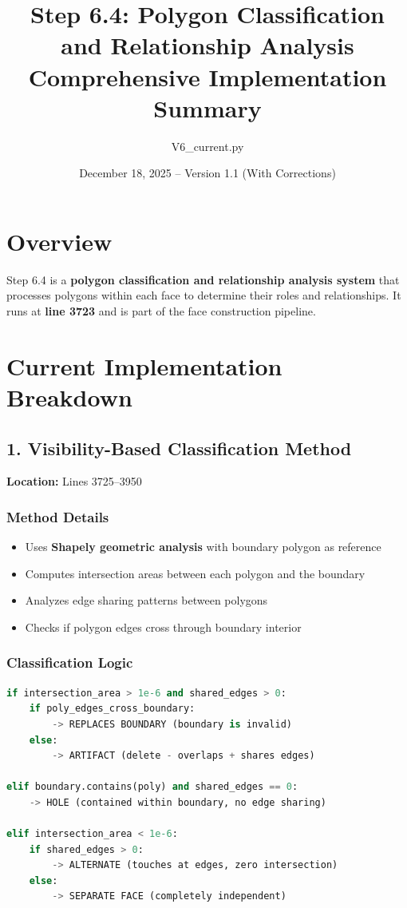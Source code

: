 \documentclass[11pt]{article}
\title{Step 6.4: Polygon Classification and Relationship Analysis\\
\large Comprehensive Implementation Summary}
\author{V6\_current.py}
\date{December 18, 2025 -- Version 1.1 (With Corrections)}
\begin{document}
\maketitle

\section{Overview}
Step 6.4 is a \textbf{polygon classification and relationship analysis system} that processes polygons within each face to determine their roles and relationships. It runs at \textbf{line 3723} and is part of the face construction pipeline.

\section{Current Implementation Breakdown}

\subsection{1. Visibility-Based Classification Method}
\textbf{Location:} Lines 3725--3950

\subsubsection{Method Details}
\begin{itemize}
    \item Uses \textbf{Shapely geometric analysis} with boundary polygon as reference
    \item Computes intersection areas between each polygon and the boundary
    \item Analyzes edge sharing patterns between polygons
    \item Checks if polygon edges cross through boundary interior
\end{itemize}

\subsubsection{Classification Logic}
\begin{lstlisting}[language=Python]
if intersection_area > 1e-6 and shared_edges > 0:
    if poly_edges_cross_boundary:
        -> REPLACES BOUNDARY (boundary is invalid)
    else:
        -> ARTIFACT (delete - overlaps + shares edges)
        
elif boundary.contains(poly) and shared_edges == 0:
    -> HOLE (contained within boundary, no edge sharing)
    
elif intersection_area < 1e-6:
    if shared_edges > 0:
        -> ALTERNATE (touches at edges, zero intersection)
    else:
        -> SEPARATE FACE (completely independent)
\end{lstlisting}
\end{document}
